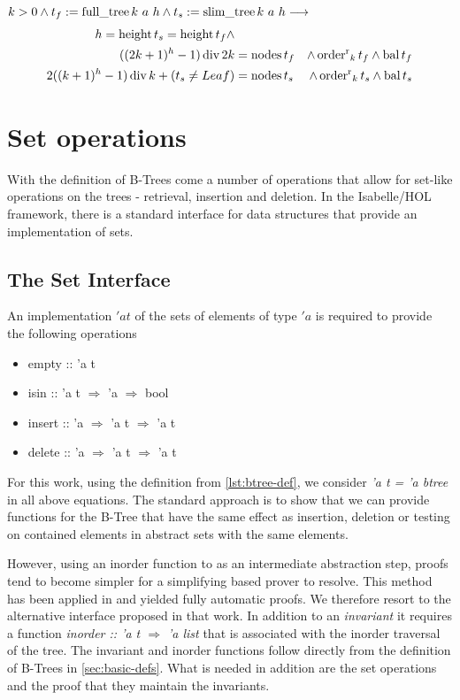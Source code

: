 \begin{theorem}
    $k > 0 \wedge t_f := \operatorname{full\_tree} k\ a\ h \wedge t_s := \operatorname{slim\_tree} k\ a\ h \longrightarrow$
    \begin{align}
    h = \operatorname{height} t_s = \operatorname{height} t_f \wedge \\
        ((2k+1)^h - 1) \operatorname{div} 2k &= \operatorname{nodes} t_f &\wedge \operatorname{order^r}_k t_f \wedge \operatorname{bal} t_f \\ 
        2((k+1)^h - 1) \operatorname{div} k + (t_s \neq Leaf) &= \operatorname{nodes} t_s &\wedge \operatorname{order^r}_k t_s \wedge \operatorname{bal} t_s
    \end{align}
\end{theorem}


\section{Set operations}

With the definition of B-Trees come a number of operations that allow for set-like operations
on the trees - retrieval, insertion and deletion.
In the Isabelle/HOL framework, there is a standard interface
for data structures that provide an implementation of sets.

\subsection{The Set Interface}

An implementation $'a t$ of the sets of elements of type $'a$ is required to provide the following
operations

\begin{itemize}
    \itshape
    \item empty :: 'a t
    \item isin :: 'a t $\Rightarrow$ 'a $\Rightarrow$ bool
    \item insert :: 'a $\Rightarrow$ 'a t $\Rightarrow$ 'a t
    \item delete :: 'a $\Rightarrow$ 'a t $\Rightarrow$ 'a t
\end{itemize}

For this work, using the definition from \autoref{lst:btree-def},
we consider \textit{'a t = 'a btree} in all above equations.
The standard approach is to show that we can provide functions for the B-Tree
that have the same effect as insertion, deletion or testing on contained elements
in abstract sets with the same elements.

However, using an inorder function to
as an intermediate abstraction step, proofs tend to become simpler for a simplifying
based prover to resolve. 
This method has been applied in \parencite{DBLP:conf/itp/Nipkow16} and yielded
fully automatic proofs.
We therefore resort to the alternative interface proposed in that work.
In addition to an \textit{invariant}
it requires a function \textit{inorder :: 'a t $\Rightarrow$ 'a list}
that is associated with the inorder traversal of the tree.
The invariant and inorder functions follow directly from the
definition of B-Trees in \autoref{sec:basic-defs}.
What is needed in addition are the set operations
and the proof that they maintain the invariants.


